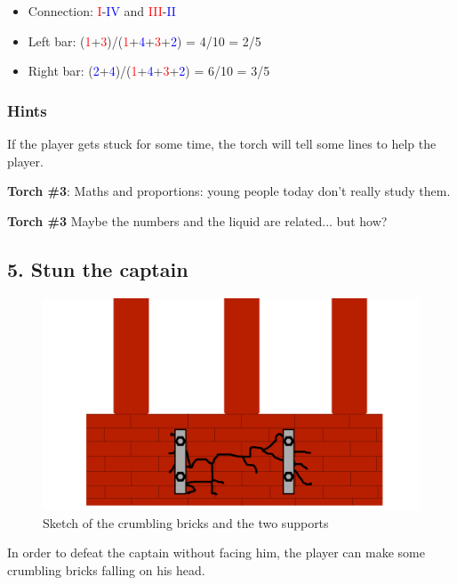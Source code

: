 \begin{itemize}
	\item Connection: \textcolor{red}{I}-\textcolor{blue}{IV} and \textcolor{red}{III}-\textcolor{blue}{II}
	\item Left bar: (\textcolor{red}{1}+\textcolor{red}{3})/(\textcolor{red}{1}+\textcolor{blue}{4}+\textcolor{red}{3}+\textcolor{blue}{2}) = 4/10 = 2/5
	\item Right bar: (\textcolor{blue}{2}+\textcolor{blue}{4})/(\textcolor{red}{1}+\textcolor{blue}{4}+\textcolor{red}{3}+\textcolor{blue}{2}) = 6/10 = 3/5
\end{itemize}

\subsubsection*{Hints}
If the player gets stuck for some time, the torch will tell some lines to help the player.

\textbf{Torch \#{}3}: Maths and proportions: young people today don't really study them.

\textbf{Torch \#{}3} Maybe the numbers and the liquid are related... but how? 


\subsection{5. Stun the captain}

\begin{figure}[H]
  \centering
  \includegraphics[width=\textwidth]{Images/Puzzles/castleOfDynamia5}
  \caption{Sketch of the crumbling bricks and the two supports}
\end{figure}

In order to defeat the captain without facing him, the player can make some crumbling bricks falling on his head.

